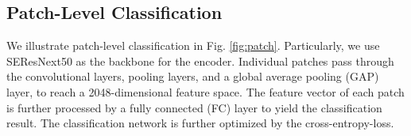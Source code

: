 \subsection{Patch-Level Classification}
\label{section-3-2}



We illustrate patch-level classification in Fig. \ref{fig:patch}.
Particularly, we use SEResNext50 as the backbone for the encoder. 
Individual patches pass through the convolutional layers, pooling layers, and a global average pooling (GAP) layer, to reach a 2048-dimensional feature space. 
The feature vector of each patch is further processed by a fully connected (FC) layer to yield the classification result. The classification network is further optimized by the cross-entropy-loss. 

